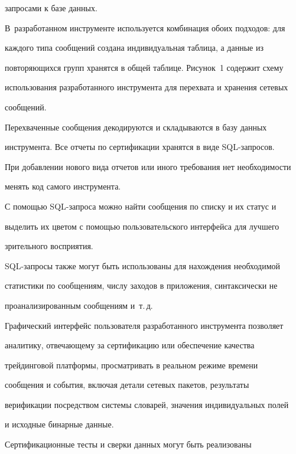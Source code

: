 за\-про\-са\-ми к базе данных.


В~разработанном инструменте используется комбинация обоих подходов: для


каждого типа сообщений создана индивидуальная таблица, а данные из


повторяющихся групп хранятся в общей таблице. Рисунок~1 содержит схему


использования разработанного инструмента для перехвата и хранения сетевых


сообщений.








Перехваченные сообщения декодируются и складываются в базу данных


инструмента. Все отчеты по сертификации хранятся в виде SQL-за\-про\-сов.


При добавлении нового вида отчетов или иного требования нет необходимости


менять код самого инструмента.





С помощью SQL-запроса можно найти сообщения по списку и их статус и


выделить их цветом с помощью пользовательского интерфейса для лучшего


зрительного восприятия.


SQL-за\-про\-сы также могут быть использованы для нахождения необходимой


статистики по сообщениям, числу заходов в приложения, синтаксически не


проанализированным сообщениям и~т.\,д.





Графический интерфейс пользователя разработанного инструмента позволяет


аналитику, отвечающему за сертификацию или обеспечение качества


трейдинговой платформы, просматривать в реальном режиме времени


сообщения и события, включая детали сетевых пакетов, результаты


верификации посредством системы словарей, значения индивидуальных полей


и исходные бинарные данные.





Сертификационные тесты и сверки данных могут быть реализованы


